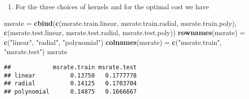 \documentclass[]{article}
\newenvironment{Shaded}{\begin{snugshade}}{\end{snugshade}}
\newcommand{\KeywordTok}[1]{\textcolor[rgb]{0.13,0.29,0.53}{\textbf{#1}}}
\newcommand{\NormalTok}[1]{#1}
\newcommand{\StringTok}[1]{\textcolor[rgb]{0.31,0.60,0.02}{#1}}
\providecommand{\tightlist}{%
  \setlength{\itemsep}{0pt}\setlength{\parskip}{0pt}}
\begin{document}
\begin{enumerate}
\def\labelenumi{(\alph{enumi})}
\setcounter{enumi}{7}
\tightlist
\item
  For the three choices of kernels and for the optimal cost we have
\end{enumerate}

\begin{Shaded}
\begin{Highlighting}[]
\NormalTok{msrate =}\StringTok{ }\KeywordTok{cbind}\NormalTok{(}\KeywordTok{c}\NormalTok{(msrate.train.linear, msrate.train.radial, msrate.train.poly), }\KeywordTok{c}\NormalTok{(msrate.test.linear, }
\NormalTok{    msrate.test.radial, msrate.test.poly))}
\KeywordTok{rownames}\NormalTok{(msrate) =}\StringTok{ }\KeywordTok{c}\NormalTok{(}\StringTok{"linear"}\NormalTok{, }\StringTok{"radial"}\NormalTok{, }\StringTok{"polynomial"}\NormalTok{)}
\KeywordTok{colnames}\NormalTok{(msrate) =}\StringTok{ }\KeywordTok{c}\NormalTok{(}\StringTok{"msrate.train"}\NormalTok{, }\StringTok{"msrate.test"}\NormalTok{)}
\NormalTok{msrate}
\end{Highlighting}
\end{Shaded}

\begin{verbatim}
##            msrate.train msrate.test
## linear          0.13750   0.1777778
## radial          0.14125   0.1703704
## polynomial      0.14875   0.1666667
\end{verbatim}
\end{document}
